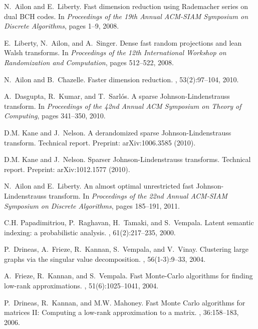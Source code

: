 \documentclass[twoside]{article}
\begin{document}
\begin{small}
\begin{thebibliography}{100}
N.~Ailon and E.~Liberty.
\newblock Fast dimension reduction using {R}ademacher series on dual {BCH}
  codes.
\newblock In {\em Proceedings of the 19th Annual ACM-SIAM Symposium on Discrete
  Algorithms}, pages 1--9, 2008.

E.~Liberty, N.~Ailon, and A.~Singer.
\newblock Dense fast random projections and lean {W}alsh transforms.
\newblock In {\em Proceedings of the 12th International Workshop on
  Randomization and Computation}, pages 512--522, 2008.

N.~Ailon and B.~Chazelle.
\newblock Faster dimension reduction.
, 53(2):97--104, 2010.

A.~Dasgupta, R.~Kumar, and T.~Sarl\'{o}s.
\newblock A sparse {J}ohnson-{L}indenstrauss transform.
\newblock In {\em Proceedings of the 42nd Annual ACM Symposium on Theory of
  Computing}, pages 341--350, 2010.

D.M. Kane and J.~Nelson.
\newblock A derandomized sparse {J}ohnson-{L}indenstrauss transform.
\newblock Technical report.
\newblock Preprint: arXiv:1006.3585 (2010).

D.M. Kane and J.~Nelson.
\newblock Sparser {J}ohnson-{L}indenstrauss transforms.
\newblock Technical report.
\newblock Preprint: arXiv:1012.1577 (2010).

N.~Ailon and E.~Liberty.
\newblock An almost optimal unrestricted fast {J}ohnson-{L}indenstrauss
  transform.
\newblock In {\em Proceedings of the 22nd Annual ACM-SIAM Symposium on Discrete
  Algorithms}, pages 185--191, 2011.

C.H. Papadimitriou, P.~Raghavan, H.~Tamaki, and S.~Vempala.
\newblock Latent semantic indexing: a probabilistic analysis.
, 61(2):217--235, 2000.

P.~Drineas, A.~Frieze, R.~Kannan, S.~Vempala, and V.~Vinay.
\newblock Clustering large graphs via the singular value decomposition.
, 56(1-3):9--33, 2004.

A.~Frieze, R.~Kannan, and S.~Vempala.
\newblock Fast {Monte-Carlo} algorithms for finding low-rank approximations.
, 51(6):1025--1041, 2004.

P.~Drineas, R.~Kannan, and M.W. Mahoney.
\newblock Fast {Monte Carlo} algorithms for matrices {II}: Computing a low-rank
  approximation to a matrix.
, 36:158--183, 2006.


\end{thebibliography}
\end{small}
\end{document}
